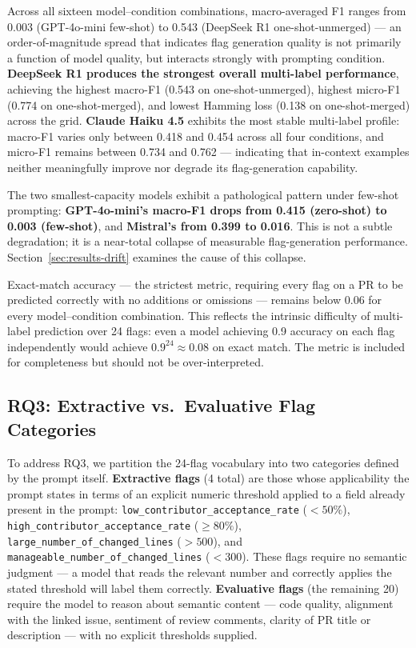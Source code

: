 Across all sixteen model--condition combinations, macro-averaged F1
ranges from 0.003 (GPT-4o-mini few-shot) to 0.543 (DeepSeek R1
one-shot-unmerged) --- an order-of-magnitude spread that indicates
flag generation quality is not primarily a function of model quality,
but interacts strongly with prompting condition.  \textbf{DeepSeek R1
produces the strongest overall multi-label performance}, achieving the
highest macro-F1 (0.543 on one-shot-unmerged), highest micro-F1
(0.774 on one-shot-merged), and lowest Hamming loss (0.138 on
one-shot-merged) across the grid.  \textbf{Claude Haiku 4.5} exhibits
the most stable multi-label profile: macro-F1 varies only between
0.418 and 0.454 across all four conditions, and micro-F1 remains
between 0.734 and 0.762 --- indicating that in-context examples
neither meaningfully improve nor degrade its flag-generation
capability.

The two smallest-capacity models exhibit a pathological pattern under
few-shot prompting: \textbf{GPT-4o-mini's macro-F1 drops from 0.415
(zero-shot) to 0.003 (few-shot)}, and \textbf{Mistral's from 0.399 to
0.016}.  This is not a subtle degradation; it is a near-total collapse
of measurable flag-generation performance.
Section~\ref{sec:results-drift} examines the cause of this collapse.

Exact-match accuracy --- the strictest metric, requiring every flag on
a PR to be predicted correctly with no additions or omissions ---
remains below 0.06 for every model--condition combination.  This
reflects the intrinsic difficulty of multi-label prediction over 24
flags: even a model achieving 0.9 accuracy on each flag independently
would achieve $0.9^{24} \approx 0.08$ on exact match.  The metric is
included for completeness but should not be over-interpreted.

\subsection{RQ3: Extractive vs.\ Evaluative Flag
Categories}\label{sec:results-rq3}

To address RQ3, we partition the 24-flag vocabulary into two
categories defined by the prompt itself.  \textbf{Extractive flags}
(4 total) are those whose applicability the prompt states in terms of
an explicit numeric threshold applied to a field already present in
the prompt: \texttt{low\_contributor\_acceptance\_rate}
($<50\%$), \texttt{high\_contributor\_acceptance\_rate}
($\geq 80\%$), \texttt{large\_number\_of\_changed\_lines}
($>500$), and \texttt{manageable\_number\_of\_changed\_lines}
($<300$).  These flags require no semantic judgment --- a model that
reads the relevant number and correctly applies the stated threshold
will label them correctly.  \textbf{Evaluative flags} (the remaining
20) require the model to reason about semantic content --- code
quality, alignment with the linked issue, sentiment of review
comments, clarity of PR title or description --- with no explicit
thresholds supplied.

